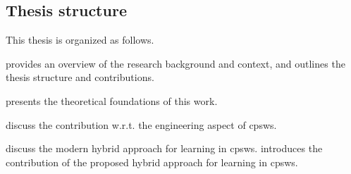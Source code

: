 \begin{refsection}
\section{Thesis structure}
This thesis is organized as follows.

 provides an overview of the research background and context, 
 and outlines the thesis structure and contributions.

 presents the theoretical foundations of this work.

 discuss the contribution w.r.t. the engineering aspect of \acp{cpsw}.

 discuss the modern hybrid approach for learning in \acp{cpsw}.
 introduces the contribution of the proposed hybrid approach for learning in \acp{cpsw}.

\printbibliography[title=Reference,heading=bibintoc]
\end{refsection}
